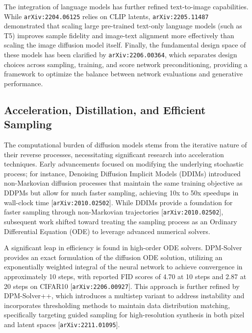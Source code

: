 \documentclass[11pt]{article}
\begin{document}
The integration of language models has further refined text-to-image capabilities. While \texttt{arXiv:2204.06125} relies on CLIP latents, \texttt{arXiv:2205.11487} demonstrated that scaling large pre-trained text-only language models (such as T5) improves sample fidelity and image-text alignment more effectively than scaling the image diffusion model itself. Finally, the fundamental design space of these models has been clarified by \texttt{arXiv:2206.00364}, which separates design choices across sampling, training, and score network preconditioning, providing a framework to optimize the balance between network evaluations and generative performance.

\subsection{Acceleration, Distillation, and Efficient Sampling}

The computational burden of diffusion models stems from the iterative nature of their reverse processes, necessitating significant research into acceleration techniques. Early advancements focused on modifying the underlying stochastic process; for instance, Denoising Diffusion Implicit Models (DDIMs) introduced non-Markovian diffusion processes that maintain the same training objective as DDPMs but allow for much faster sampling, achieving 10x to 50x speedups in wall-clock time [\texttt{arXiv:2010.02502}]. While DDIMs provide a foundation for faster sampling through non-Markovian trajectories [\texttt{arXiv:2010.02502}], subsequent work shifted toward treating the sampling process as an Ordinary Differential Equation (ODE) to leverage advanced numerical solvers.

A significant leap in efficiency is found in high-order ODE solvers. DPM-Solver provides an exact formulation of the diffusion ODE solution, utilizing an exponentially weighted integral of the neural network to achieve convergence in approximately 10 steps, with reported FID scores of 4.70 at 10 steps and 2.87 at 20 steps on CIFAR10 [\texttt{arXiv:2206.00927}]. This approach is further refined by DPM-Solver++, which introduces a multistep variant to address instability and incorporates thresholding methods to maintain data distribution matching, specifically targeting guided sampling for high-resolution synthesis in both pixel and latent spaces [\texttt{arXiv:2211.01095}].
\end{document}
